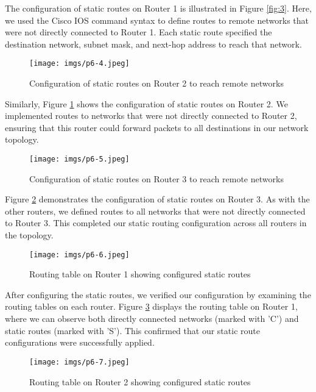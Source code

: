 \documentclass[twoside]{article}
\begin{document}
\begin{multicols}{2}
The configuration of static routes on Router 1 is illustrated in Figure \ref{fig:3}. Here, we used the Cisco IOS command syntax to define routes to remote networks that were not directly connected to Router 1. Each static route specified the destination network, subnet mask, and next-hop address to reach that network.

\begin{figure}[H]
    \centering
    \texttt{[image: imgs/p6-4.jpeg]}
    \caption{Configuration of static routes on Router 2 to reach remote networks}
    \label{fig:4}
\end{figure}

Similarly, Figure \ref{fig:4} shows the configuration of static routes on Router 2. We implemented routes to networks that were not directly connected to Router 2, ensuring that this router could forward packets to all destinations in our network topology.

\begin{figure}[H]
    \centering
    \texttt{[image: imgs/p6-5.jpeg]}
    \caption{Configuration of static routes on Router 3 to reach remote networks}
    \label{fig:5}
\end{figure}

Figure \ref{fig:5} demonstrates the configuration of static routes on Router 3. As with the other routers, we defined routes to all networks that were not directly connected to Router 3. This completed our static routing configuration across all routers in the topology.

\begin{figure}[H]
    \centering
    \texttt{[image: imgs/p6-6.jpeg]}
    \caption{Routing table on Router 1 showing configured static routes}
    \label{fig:6}
\end{figure}

After configuring the static routes, we verified our configuration by examining the routing tables on each router. Figure \ref{fig:6} displays the routing table on Router 1, where we can observe both directly connected networks (marked with 'C') and static routes (marked with 'S'). This confirmed that our static route configurations were successfully applied.

\begin{figure}[H]
    \centering
    \texttt{[image: imgs/p6-7.jpeg]}
    \caption{Routing table on Router 2 showing configured static routes}
    \label{fig:7}
\end{figure}


\end{multicols}
\end{document}
